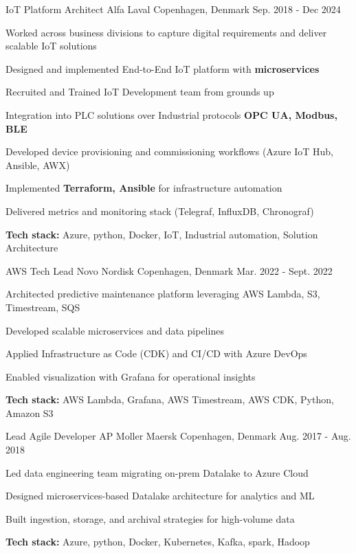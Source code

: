 \begin{cventries}
\cventry
{IoT Platform Architect} %
{Alfa Laval} %
{Copenhagen, Denmark} %
{Sep. 2018 - Dec 2024} %
{ %
\begin{cvitems}
\item Worked across business divisions to capture digital requirements and deliver scalable IoT solutions
\item Designed and implemented End-to-End IoT platform with \textbf{microservices}
\item Recruited and Trained IoT Development team from grounds up
\item Integration into PLC solutions over Industrial protocols \textbf{OPC UA, Modbus, BLE}
\item Developed device provisioning and commissioning workflows (Azure IoT Hub, Ansible, AWX)
\item Implemented \textbf{Terraform, Ansible} for infrastructure automation
\item Delivered metrics and monitoring stack (Telegraf, InfluxDB, Chronograf)
\item \textbf{Tech stack:} Azure, python, Docker, IoT, Industrial automation, Solution Architecture
\end{cvitems}
}



\cventry
{AWS Tech Lead} %
{Novo Nordisk} %
{Copenhagen, Denmark} %
{Mar. 2022 - Sept. 2022} %
{ %
\begin{cvitems}
\item Architected predictive maintenance platform leveraging AWS Lambda, S3, Timestream, SQS
\item Developed scalable microservices and data pipelines
\item Applied Infrastructure as Code (CDK) and CI/CD with Azure DevOps
\item Enabled visualization with Grafana for operational insights
\item \textbf{Tech stack:} AWS Lambda, Grafana, AWS Timestream, AWS CDK, Python, Amazon S3
\end{cvitems}
}



\cventry
{Lead Agile Developer} %
{AP Moller Maersk} %
{Copenhagen, Denmark} %
{Aug. 2017 - Aug. 2018} %
{ %
\begin{cvitems}
\item Led data engineering team migrating on-prem Datalake to Azure Cloud
\item Designed microservices-based Datalake architecture for analytics and ML
\item Built ingestion, storage, and archival strategies for high-volume data
\item \textbf{Tech stack:} Azure, python, Docker, Kubernetes, Kafka, spark, Hadoop
\end{cvitems}
}


\end{cventries}
